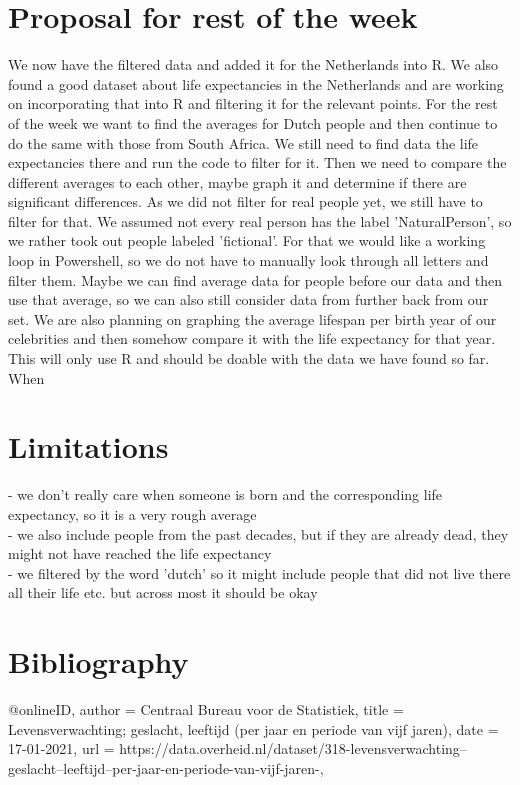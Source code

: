 \documentclass{article}
\begin{document}
\section{Proposal for rest of the week}
We now have the filtered data and added it for the Netherlands into R. We also found a good dataset about life expectancies in the Netherlands and are working on incorporating that into R and filtering it for the relevant points. For the rest of the week we want to find the averages for Dutch people and then continue to do the same with those from South Africa. We still need to find data the life expectancies there and run the code to filter for it. Then we need to compare the different averages to each other, maybe graph it and determine if there are significant differences. 
As we did not filter for real people yet, we still have to filter for that. We assumed not every real person has the label 'NaturalPerson', so we rather took out people labeled 'fictional'. For that we would like a working loop in Powershell, so we do not have to manually look through all letters and filter them. 
Maybe we can find average data for people before our data and then use that average, so we can also still consider data from further back from our set. 
We are also planning on graphing the average lifespan per birth year of our celebrities and then somehow compare it with the life expectancy for that year. This will only use R and should be doable with the data we have found so far. When 

\section{Limitations}
- we don't really care when someone is born and the corresponding life expectancy, so it is a very rough average\\
- we also include people from the past decades, but if they are already dead, they might not have reached the life expectancy\\
- we filtered by the word 'dutch' so it might include people that did not live there all their life etc. but across most it should be okay\\

\section{Bibliography}
\begin{thebibliography}
@online{ID,
author = {Centraal Bureau voor de Statistiek},
title = {Levensverwachting; geslacht, leeftijd (per jaar en periode van vijf jaren)},
date = {17-01-2021},
url = {https://data.overheid.nl/dataset/318-levensverwachting--geslacht--leeftijd--per-jaar-en-periode-van-vijf-jaren-},
}
\end{thebibliography}
\end{document}
